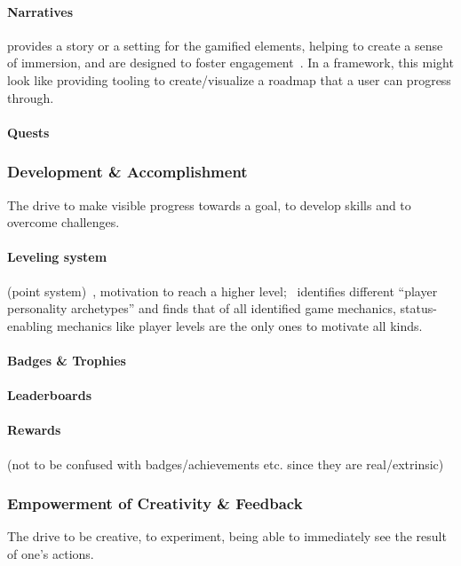 \documentclass[runningheads]{llncs}
\begin{document}
\paragraph{Narratives} provides a story or a setting for the gamified elements, helping to create a sense of immersion, and are designed to foster engagement~\cite{MRGA15}. In a framework, this might look like providing tooling to create/visualize a roadmap that a user can progress through.

\paragraph{Quests} 

\subsubsection{Development \& Accomplishment}\cite{Chou15} The drive to make visible progress towards a goal, to develop skills and to overcome challenges.

\paragraph{Leveling system} (point system)~\cite{DeDKN11, SaHMM17, XiZIA18}, motivation to reach a higher level;~\cite{Yongw15} identifies different \enquote{player personality archetypes} and finds that of all identified game mechanics, status-enabling mechanics like player levels are the only ones to motivate all kinds.

\paragraph{Badges \& Trophies~\cite{SaHMM17}}

\paragraph{Leaderboards}

\paragraph{Rewards} (not to be confused with badges/achievements etc. since they are real/extrinsic)

\subsubsection{Empowerment of Creativity \& Feedback}\cite{Chou15} The drive to be creative, to experiment, being able to immediately see the result of one's actions.
\end{document}
